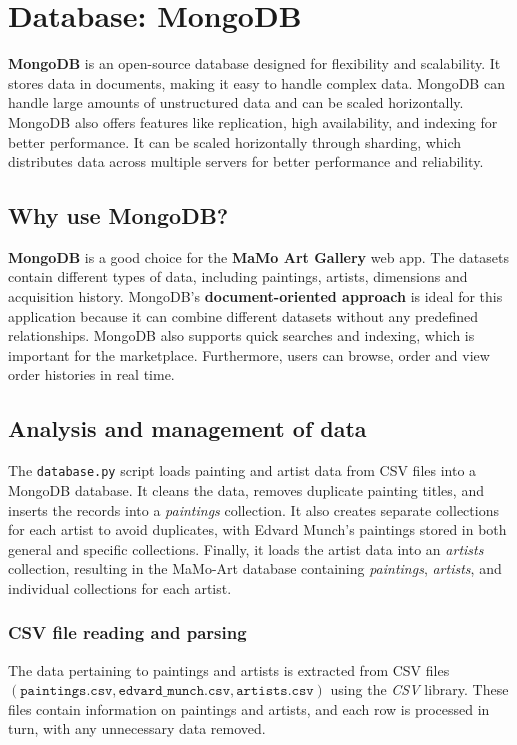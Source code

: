 \documentclass[a4paper,12pt]{article}
\begin{document}
\newpage
\section{Database: MongoDB}
\justify

\textbf{MongoDB} is an open-source database designed for flexibility and scalability. It stores data in documents, making it easy to handle complex data. MongoDB can handle large amounts of unstructured data and can be scaled horizontally. MongoDB also offers features like replication, high availability, and indexing for better performance. It can be scaled horizontally through sharding, which distributes data across multiple servers for better performance and reliability.


\subsection{Why use MongoDB?}
\justify
\textbf{MongoDB} is a good choice for the \textbf{MaMo Art Gallery} web app. The datasets contain different types of data, including paintings, artists, dimensions and acquisition history. MongoDB's \textbf{document-oriented approach} is ideal for this application because it can combine different datasets without any predefined relationships. MongoDB also supports quick searches and indexing, which is important for the marketplace. Furthermore, users can browse, order and view order histories in real time.

\subsection{Analysis and management of data}
\justify

The \texttt{database.py} script loads painting and artist data from CSV files into a MongoDB database. It cleans the data, removes duplicate painting titles, and inserts the records into a \textit{paintings} collection. It also creates separate collections for each artist to avoid duplicates, with Edvard Munch's paintings stored in both general and specific collections. Finally, it loads the artist data into an \textit{artists} collection, resulting in the MaMo-Art database containing \textit{paintings}, \textit{artists}, and individual collections for each artist.

\subsubsection{CSV file reading and parsing}
The data pertaining to paintings and artists is extracted from CSV files $\left(\texttt{paintings.csv}, \texttt{edvard\_munch.csv}, \texttt{artists.csv}\right)$ using the \textit{CSV} library. These files contain information on paintings and artists, and each row is processed in turn, with any unnecessary data removed.
\end{document}
